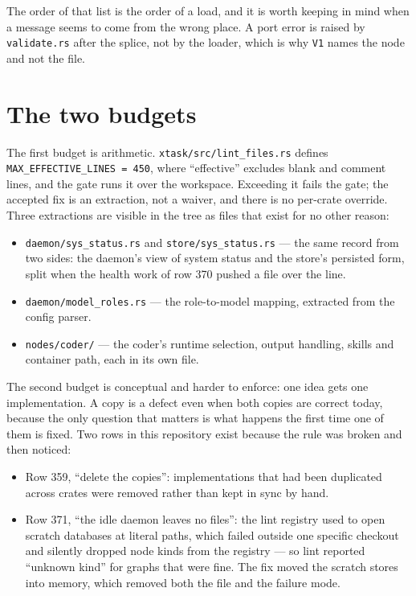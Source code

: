 The order of that list is the order of a load, and it is worth keeping in mind when a message seems
to come from the wrong place. A port error is raised by \texttt{validate.rs} after the splice, not
by the loader, which is why \texttt{V1} names the node and not the file.

\section{The two budgets}

The first budget is arithmetic. \texttt{xtask/src/lint\_files.rs} defines
\texttt{MAX\_EFFECTIVE\_LINES = 450}, where \enquote{effective} excludes blank and comment lines,
and the gate runs it over the workspace. Exceeding it fails the gate; the accepted fix is an
extraction, not a waiver, and there is no per-crate override. Three extractions are visible in the
tree as files that exist for no other reason:

\begin{itemize}
	\item \texttt{daemon/sys\_status.rs} and \texttt{store/sys\_status.rs} --- the same record from
	two sides: the daemon's view of system status and the store's persisted form, split when the
	health work of row 370 pushed a file over the line.
	\item \texttt{daemon/model\_roles.rs} --- the role-to-model mapping, extracted from the config
	parser.
	\item \texttt{nodes/coder/} --- the coder's runtime selection, output handling, skills and
	container path, each in its own file.
\end{itemize}

The second budget is conceptual and harder to enforce: one idea gets one implementation. A copy is
a defect even when both copies are correct today, because the only question that matters is what
happens the first time one of them is fixed. Two rows in this repository exist because the rule was
broken and then noticed:

\begin{itemize}
	\item Row 359, \enquote{delete the copies}: implementations that had been duplicated across
	crates were removed rather than kept in sync by hand.
	\item Row 371, \enquote{the idle daemon leaves no files}: the lint registry used to open scratch
	databases at literal paths, which failed outside one specific checkout and silently dropped node
	kinds from the registry --- so lint reported \enquote{unknown kind} for graphs that were fine.
	The fix moved the scratch stores into memory, which removed both the file and the failure mode.
\end{itemize}

